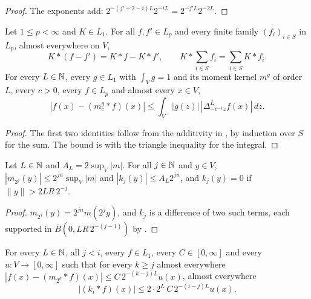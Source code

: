 \begin{proof}
\leanok
The exponents add: $2^{-(j'+2-i)L} 2^{-iL} = 2^{-j'L} 2^{-2L}$.
\end{proof}

\begin{lemma}
\label{lem:conv-second-argument}
\leanok
{}
Let $1 \leq p < \infty$ and $K \in L_1$. For all $f, f' \in L_p$ and every finite family
$(f_i)_{i \in S}$ in $L_p$, almost everywhere on $V$,
\[
  K * (f - f') = K * f - K * f', \qquad K * \sum_{i \in S} f_i = \sum_{i \in S} K * f_i .
\]
For every $L \in \mathbb{N}$, every $g \in L_1$ with $\int_V g = 1$ and its moment kernel $m^g$ of
order $L$, every $c > 0$, every $f \in L_p$ and almost every $x \in V$,
\[
  |f(x) - (m^g_c * f)(x)| \leq \int_V |g(z)| \, |\Delta^L_{-c^{-1} z} f(x)| \, dz .
\]
\end{lemma}

\begin{proof}
\leanok
The first two identities follow from the additivity in , by induction over
$S$ for the sum. The bound is  with the triangle inequality for
the integral.
\end{proof}

\begin{lemma}
\label{lem:local-means-kernel-bounds}
\leanok
{}
Let $L \in \mathbb{N}$ and $A_L = 2 \sup_V |m|$. For all $j \in \mathbb{N}$ and $y \in V$,
$|m_{2^j}(y)| \leq 2^{jn} \sup_V |m|$ and $|k_j(y)| \leq A_L 2^{jn}$, and $k_j(y) = 0$ if
$\|y\| > 2 L R \, 2^{-j}$.
\end{lemma}

\begin{proof}
\leanok
$m_{2^j}(y) = 2^{jn} m(2^j y)$, and $k_j$ is a difference of two such terms, each supported in
$\overline B(0, L R \, 2^{-(j-1)})$ by .
\end{proof}

\begin{lemma}
\label{lem:local-means-one-scale}
\leanok
{}
For every $L \in \mathbb{N}$, all $j < i$, every $f \in L_1$, every $C \in [0, \infty]$ and every
$u : V \to [0, \infty]$ such that for every $k \geq j$ almost everywhere
$|f(x) - (m_{2^k} * f)(x)| \leq C \, 2^{-(k-j)L} u(x)$, almost everywhere
\[
  |(k_i * f)(x)| \leq 2 \cdot 2^L \, C \, 2^{-(i-j)L} u(x) .
\]
\end{lemma}

